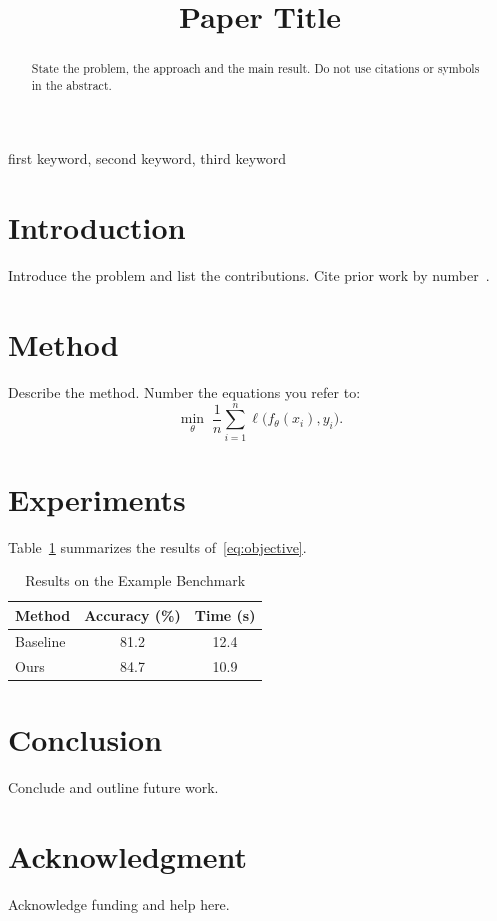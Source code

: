 \documentclass[conference]{IEEEtran}
\begin{document}
\title{Paper Title}

\author{
\and
{}
}

\maketitle

\begin{abstract}
State the problem, the approach and the main result. Do not use citations or
symbols in the abstract.
\end{abstract}

\begin{IEEEkeywords}
first keyword, second keyword, third keyword
\end{IEEEkeywords}

\section{Introduction}
Introduce the problem and list the contributions. Cite prior work by
number~\cite{lamport1994latex,knuth1984texbook}.

\section{Method}
Describe the method. Number the equations you refer to:
\begin{equation}
  \label{eq:objective}
  \min_{\theta} \; \frac{1}{n} \sum_{i=1}^{n} \ell\bigl(f_\theta(x_i), y_i\bigr) .
\end{equation}

\section{Experiments}
Table~\ref{tab:results} summarizes the results of~\eqref{eq:objective}.

\begin{table}[htbp]
  \caption{Results on the Example Benchmark}
  \label{tab:results}
  \centering
  \begin{tabular}{lcc}
    \toprule
    Method   & Accuracy (\%) & Time (s) \\
    \midrule
    Baseline & 81.2          & 12.4     \\
    Ours     & 84.7          & 10.9     \\
    \bottomrule
  \end{tabular}
\end{table}

\section{Conclusion}
Conclude and outline future work.

\section*{Acknowledgment}
Acknowledge funding and help here.


\end{document}
